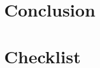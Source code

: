\documentclass{article}
\begin{document}

\section{Conclusion}\label{sec:conclusion}
\printbibliography
\section*{Checklist}

\end{document}
